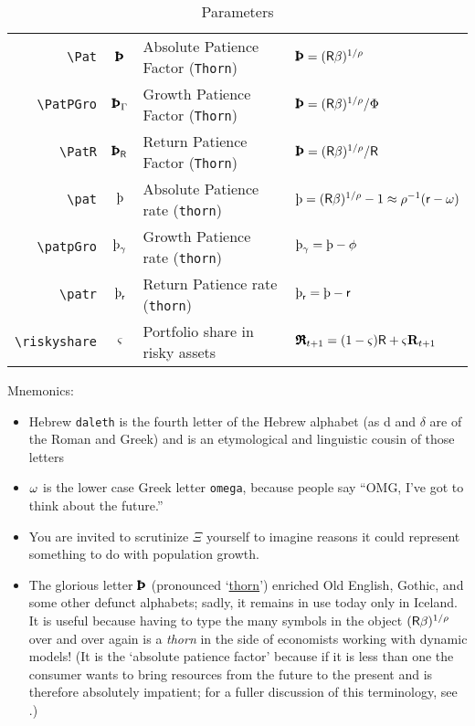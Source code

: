 \documentclass[12pt]{econtex}
\begin{document}
\begin{table}[h]
\begin{tabular}{|>{\ttfamily}rcll|}
  \\ \verb|\Pat|  & $\Pat$ & Absolute Patience Factor (\texttt{Thorn}) & $\Pat = (\Rfree \DiscFac)^{1/\CRRA} $
  \\ \verb|\PatPGro| & $\PatPGro$ & Growth Patience Factor (\texttt{Thorn}) & $\Pat = (\Rfree \DiscFac)^{1/\CRRA}/\PtyGro $
  \\ \verb|\PatR| & $\PatR$ & Return Patience Factor (\texttt{Thorn}) & $\Pat = (\Rfree \DiscFac)^{1/\CRRA}/\Rfree $ 
  \\ \verb|\pat|  & $\pat$ & Absolute Patience rate (\texttt{thorn}) & $\pat = (\Rfree \DiscFac)^{1/\CRRA}-1 \approx \CRRA^{-1}(\rfree-\discRte) $
  \\ \verb|\patpGro| & $\patpGro$ & Growth Patience rate (\texttt{thorn}) & $\patpGro = \pat -\ptyGro $
  \\ \verb|\patr| & $\patr$ & Return Patience rate (\texttt{thorn}) & $\patr =\pat -\rfree $
  \\ \verb|\riskyshare|  & $\varsigma$ & Portfolio share in risky assets & $\pmb{\mathfrak{R}}_{t+1}=(1-\varsigma)\mathsf{R}+\varsigma\mathbf{R}_{t+1}$
  \\	\hline
	\end{tabular}
	\caption{Parameters}
	\label{table:Parameters}
\end{table}	

Mnemonics:
\begin{itemize}
\item Hebrew \texttt{daleth} is the fourth letter of the Hebrew alphabet (as d and $\delta$ are of the Roman and Greek) and is an etymological and linguistic cousin of those letters
\item $\omega$ is the lower case Greek letter \texttt{omega}, because people say ``OMG, I've got to think about the future.''
\item You are invited to scrutinize $\Xi$ yourself to imagine reasons it could represent something to do with population growth.  
\item The glorious letter $\Pat$ (pronounced `\href{http://en.wikipedia.org/wiki/Thorn_(letter)}{thorn}') enriched Old English, Gothic, and some other defunct alphabets; sadly, it remains in use today only in Iceland.  It is useful because having to type the many symbols in the object $(\mathsf{R} \beta)^{1/\rho}$ over and over again is a \textit{thorn} in the side of economists working with dynamic models!  (It is the `absolute patience factor' because if it is less than one the consumer wants to bring resources from the future to the present and is therefore absolutely impatient; for a fuller discussion of this terminology, see \cite{carrollTractable}.)
\end{itemize}
\end{document}
